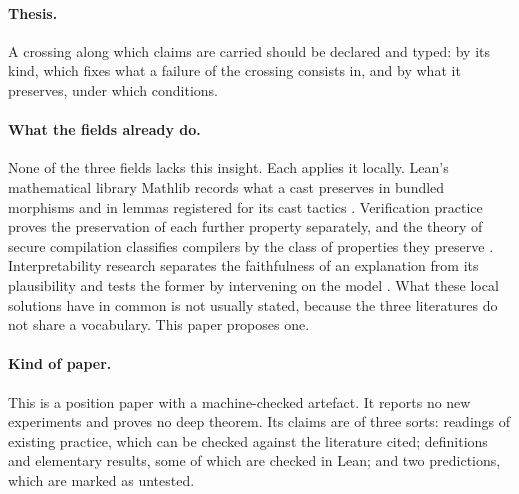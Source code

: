 \paragraph{Thesis.} A crossing along which claims are carried should be declared and
typed: by its kind, which fixes what a failure of the crossing consists in, and by what it
preserves, under which conditions.

\paragraph{What the fields already do.} None of the three fields lacks this insight. Each
applies it locally. Lean's mathematical library Mathlib records what a cast preserves in
bundled morphisms and in lemmas registered for its cast tactics
\citep{mathlib2020,lewis2020}. Verification practice proves the preservation of each
further property separately, and the theory of secure compilation classifies compilers by
the class of properties they preserve \citep{clarkson2010,abate2019}. Interpretability
research separates the faithfulness of an explanation from its plausibility and tests the
former by intervening on the model \citep{jacovi2020,geiger2025}. What these local
solutions have in common is not usually stated, because the three literatures do not
share a vocabulary. This paper proposes one.

\paragraph{Kind of paper.} This is a position paper with a machine-checked artefact. It
reports no new experiments and proves no deep theorem. Its claims are of three sorts:
readings of existing practice, which can be checked against the literature cited;
definitions and elementary results, some of which are checked in Lean; and two
predictions, which are marked as untested.

